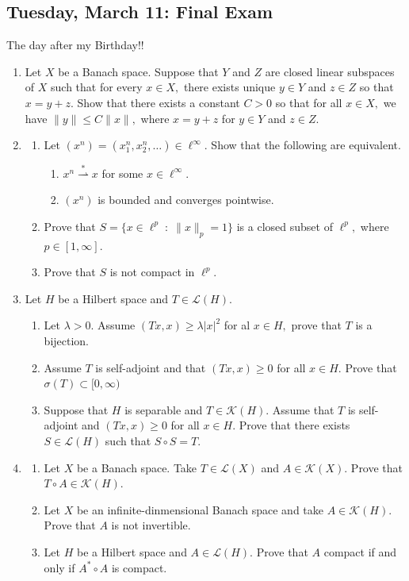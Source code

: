 \documentclass[10pt, oneside]{article}
\theoremstyle{definition}
\begin{document}
\subsection{Tuesday, March 11: Final Exam}
The day after my Birthday!! 
\begin{enumerate}
    \item Let $X$ be a Banach space. Suppose that $Y$ and $Z$ are closed linear subspaces of $X$ such that for every $x\in X,$ there exists unique $y \in Y$ and $z\in Z$ so that $x = y + z.$ Show that there exists a constant $C>0$ so that for all $x\in X,$ we have $\|y\| \leq C\|x\|,$ where $x = y + z$ for $y\in Y$ and $z\in Z.$
    \item 
    \begin{enumerate}
        \item Let $(x^n) = (x_1^n, x_2^n, \dots ) \in \ell^\infty.$ Show that the following are equivalent. 
        \begin{enumerate}
            \item $x^n\stackrel{\ast}{\rightharpoonup} x$ for some $x\in \ell^\infty.$
            \item $(x^n)$ is bounded and converges pointwise.
        \end{enumerate}
        \item Prove that $S = \{x \in \ell^p \; : \; \|x\|_p = 1\}$ is a closed subset of $\ell^p,$ where $p \in [1, \infty].$
        \item Prove that $S$ is not compact in $\ell^p.$
    \end{enumerate}
    \item Let $H$ be a Hilbert space and $T \in \mathcal{L}(H).$
    \begin{enumerate}
        \item Let $\lambda >0.$ Assume $(Tx, x) \geq \lambda |x|^2$ for al $x\in H,$ prove that $T$ is a bijection.
        \item Assume $T$ is self-adjoint and that $(Tx, x) \geq 0$ for all $x\in H.$ Prove that $\sigma(T)\subset [0, \infty)$
        \item Suppose that $H$ is separable and $T\in \mathcal{K}(H).$ Assume that $T$ is self-adjoint and $(Tx, x)\geq 0$ for all $x\in H.$ Prove that there exists  $S\in \mathcal{L}(H)$ such that $S\circ S = T.$
                \end{enumerate}
                \item
\begin{enumerate}
    \item Let $X$ be a Banach space. Take $T \in \mathcal{L}(X)$ and $A\in \mathcal{K}(X).$ Prove that $T\circ A \in \mathcal{K}(H).$
    \item Let $X$ be an infinite-dinmensional Banach space and take $A \in \mathcal{K}(H).$ Prove that $A$ is not invertible.
    \item Let $H$ be a Hilbert space and $A \in \mathcal{L}(H).$ Prove that $A$ compact if and only if $A^* \circ A$ is compact.
    \end{enumerate}


\end{enumerate}
\end{document}
